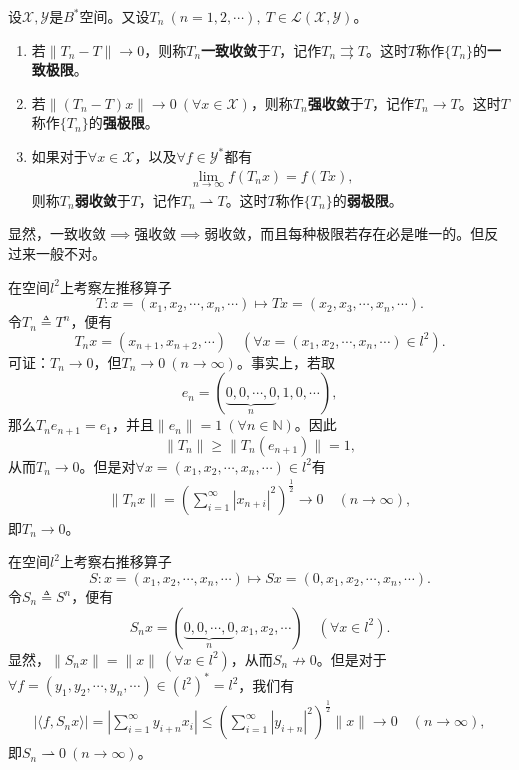 \documentclass[../../main.tex]{subfiles}%
\begin{document}
\begin{definition}
设$\mathscr{X},\mathscr{Y}$是$B^*$空间。又设$T_n\ (n=1,2,\cdots),\ T\in\mathscr{L}(\mathscr{X},\mathscr{Y})$。
\begin{enumerate}[(1)]
\item 若$\|T_n-T\|\to0$，则称$T_n$\textbf{一致收敛}于$T$，记作$T_n\rightrightarrows T$。这时$T$称作$\{T_n\}$的\textbf{一致极限}。

\item 若$\|(T_n-T)x\|\to0\ (\forall x\in\mathscr{X})$，则称$T_n$\textbf{强收敛}于$T$，记作$T_n\to T$。这时$T$称作$\{T_n\}$的\textbf{强极限}。

\item 如果对于$\forall x\in\mathscr{X}$，以及$\forall f\in\mathscr{Y}^*$都有
\begin{align*}
\lim\limits_{n\to\infty}f(T_nx)=f(Tx),
\end{align*}
则称$T_n$\textbf{弱收敛}于$T$，记作$T_n\rightharpoonup T$。这时$T$称作$\{T_n\}$的\textbf{弱极限}。
\end{enumerate}
\end{definition}
\begin{remark}
显然，一致收敛$\implies$强收敛$\implies$弱收敛，而且每种极限若存在必是唯一的。但反过来一般不对。
\end{remark}

\begin{example}[强收敛而不一致收敛]
 
在空间$l^2$上考察左推移算子
$$T:x=(x_1,x_2,\cdots,x_n,\cdots)\mapsto Tx=(x_2,x_3,\cdots,x_n,\cdots).$$
令$T_n\triangleq T^n$，便有
$$T_nx=(x_{n+1},x_{n+2},\cdots)\quad(\forall x=(x_1,x_2,\cdots,x_n,\cdots)\in l^2).$$
可证：$T_n\to0$，但$T_n\to 0\ (n\to\infty)$。事实上，若取
$$e_n=(\underbrace{0,0,\cdots,0}_{n},1,0,\cdots),$$
那么$T_ne_{n+1}=e_1$，并且$\|e_n\|=1\ (\forall n\in\mathbb{N})$。因此
$$\|T_n\|\geqslant\|T_n(e_{n+1})\|=1,$$
从而$T_n\to 0$。但是对$\forall x=(x_1,x_2,\cdots,x_n,\cdots)\in l^2$有
\begin{align*}
\|T_nx\|=\left(\sum\limits_{i=1}^{\infty}|x_{n+i}|^2\right)^{\frac{1}{2}}\to0\quad(n\to\infty),
\end{align*}
即$T_n\to0$。
\end{example}

\begin{example}[弱收敛而不强收敛]

在空间$l^2$上考察右推移算子
$$S:x=(x_1,x_2,\cdots,x_n,\cdots)\mapsto Sx=(0,x_1,x_2,\cdots,x_n,\cdots).$$
令$S_n\triangleq S^n$，便有
$$S_nx=(\underbrace{0,0,\cdots,0}_{n},x_1,x_2,\cdots)\quad(\forall x\in l^2).$$
显然，$\|S_nx\|=\|x\|\ (\forall x\in l^2)$，从而$S_n\nrightarrow0$。但是对于$\forall f=(y_1,y_2,\cdots,y_n,\cdots)\in(l^2)^*=l^2$，我们有
\begin{align*}
|\langle f,S_nx\rangle|=\left|\sum\limits_{i=1}^{\infty}y_{i+n}x_i\right|\leqslant\left(\sum\limits_{i=1}^{\infty}|y_{i+n}|^2\right)^{\frac{1}{2}}\|x\|\to0\quad(n\to\infty),
\end{align*}
即$S_n\rightharpoonup0\ (n\to\infty)$。
\end{example}
\end{document}
